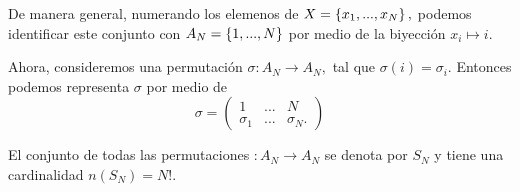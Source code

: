 De manera general, numerando los elemenos de $X=\left\{ x_{1},...,x_{N} \right\},$ podemos identificar este conjunto con $A_{N}=\left\{ 1,...,N \right\}$ por medio de la biyecci\'on $x_{i} \mapsto i.$


Ahora, consideremos una permutaci\'on $\sigma:A_{N}\to A_{N},$ tal que $\sigma(i)=\sigma_{i}.$ Entonces podemos representa $\sigma$ por medio de 
$$\sigma=
\begin{pmatrix}
1& ... & N \\
\sigma_{1}& ... & \sigma_{N}.
\end{pmatrix}
$$


El conjunto de todas las permutaciones $:A_{N}\to A_{N}$ se denota por $S_{N}$ y tiene una cardinalidad 
$n(S_{N})=N!.$

